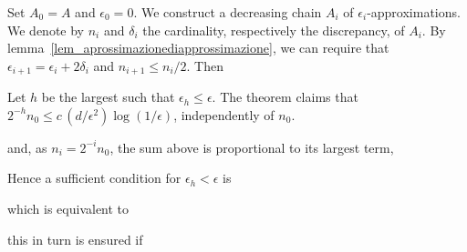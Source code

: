 \documentclass[sputnik.tex]{subfiles}
\begin{document}
\begin{void_thm}\rm
Set $A_0=A$ and $\epsilon_0=0$. We construct a decreasing chain $A_i$ of $\epsilon_i$-approximations.
We denote by $n_i$ and $\delta_i$ the cardinality, respectively the discrepancy, of $A_i$.
By lemma~\ref{lem_aprossimazionediapprossimazione}, we can require that $\epsilon_{i+1}=\epsilon_i+2\delta_i$ and $n_{i+1}\le n_i/2$.
Then


Let $h$ be the largest such that $\epsilon_h\le\epsilon$. The theorem claims that $\displaystyle 2^{-h}n_0\le c\,(d/\epsilon^2)\log(1/\epsilon)$, independently of $n_0$. 



and, as $n_i=2^{-i}n_0$, the sum above is proportional to its largest term,


Hence a sufficient condition for $\epsilon_h<\epsilon$ is 


which is equivalent to


this in turn is ensured if




\end{void_thm}


 
\end{document}
